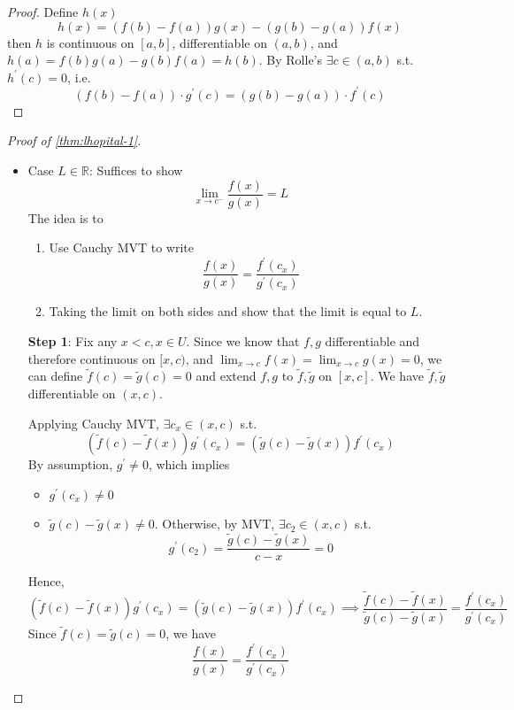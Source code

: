 \begin{proof}
    Define $h(x)$
    \[
        h(x) = 
        \left( f(b) - f(a) \right) g(x) - 
        \left( g(b) - g(a) \right) f(x)
    \]
    then $h$ is continuous on $[a, b]$, 
    differentiable on $(a,b)$,
    and $h(a) = f(b)g(a) - g(b)f(a) =h(b)$.
    By Rolle's $\exists c \in (a, b)$ s.t. $h^{\prime}(c) = 0$,
    i.e.
    \[
        \left( f(b) - f(a) \right) \cdot g^{\prime}(c)
        =
        \left( g(b) - g(a) \right) \cdot f^{\prime}(c)
    \]
\end{proof}

\begin{proof}[Proof of 
    \ref{thm:lhopital-1}
]
\begin{itemize}
    \item Case $L \in \mathbb{R}$: Suffices to show 
    \[
        \lim_{x \to c^{-}} \frac{f(x)}{g(x)} = L
    \]
    The idea is to
    \begin{enumerate}
        \item Use Cauchy MVT to write 
        \[
            \frac{{f}(x)}{{g}(x)}
            = \frac{f^{\prime}(c_x)}{g^{\prime}(c_x)}
        \]
        \item Taking the limit on both sides and show that 
        the limit is equal to $L$.
    \end{enumerate} 

    \textbf{Step 1}: Fix any $x < c, x \in U$.
    Since we know that $f, g$ differentiable and therefore
    continuous on $[x, c)$, and 
    $\lim_{x \to c} f(x) = \lim_{x \to c}g(x) = 0$,
    we can define 
    $\tilde{f}(c) = \tilde{g}(c) = 0$ and extend
    $f, g$ to $\tilde{f}, \tilde{g}$ on $[x, c]$.
    We have $\tilde{f}, \tilde{g}$ differentiable on $(x, c)$. 
    \medskip

    Applying Cauchy MVT, $\exists c_x \in (x, c)$ s.t. 
    \[
        \left( \tilde{f}(c) - \tilde{f}(x) \right) g^{\prime}(c_x) = 
        \left( \tilde{g}(c) - \tilde{g}(x) \right) f^{\prime}(c_x)
    \]
    By assumption, $g^{\prime} \neq 0$, which implies
    \begin{itemize}
        \item $g^{\prime}(c_x) \neq 0$
        \item $\tilde{g}(c) - \tilde{g}(x) \neq 0$. Otherwise,
        by MVT, $\exists c_2 \in (x, c)$ s.t. 
        \[
            g^{\prime}(c_2) = \frac{\tilde{g}(c)- \tilde{g}(x)}{c - x}= 0
        \]
    \end{itemize} 
    Hence,
    \[
        \left( \tilde{f}(c) - \tilde{f}(x) \right) g^{\prime}(c_x) = 
        \left( \tilde{g}(c) - \tilde{g}(x) \right) f^{\prime}(c_x)
        \implies
        \frac{\tilde{f}(c) - \tilde{f}(x)}{\tilde{g}(c) - \tilde{g}(x)}
        = \frac{f^{\prime}(c_x)}{g^{\prime}(c_x)}
    \]
    Since $\tilde{f}(c) = \tilde{g}(c) = 0$, we have
    \[
        \frac{f(x)}{g(x)}
        = \frac{f^{\prime}(c_x)}{g^{\prime}(c_x)}
    \]
    \medskip


\end{itemize}
\end{proof}
